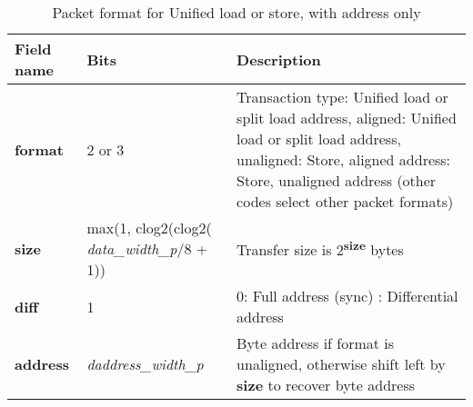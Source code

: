 \begin{table}[htp]
  \centering
  \caption{Packet format for Unified load or store, with address only}
  \label{tab:te_datadx0y1}
  \begin{tabulary}{\textwidth}{|l|p{38mm}|p{92mm}|}
    \hline
    {\bf Field name} & {\bf Bits} & {\bf Description} \\
    \hline
    \textbf{format} & 	2 or 3	& Transaction type: Unified load or split load address, aligned: Unified load or split load address, unaligned: Store, aligned address: Store, unaligned address\newline
		(other codes select other packet formats)\\
    \hline
    \textbf{size} & max(1, clog2(clog2( \textit{data\_width\_p}/8 + 1)) & Transfer size is 2\textsuperscript{\textbf{size}} bytes \\
    \hline
    \textbf{diff} & 1 & 0: Full address (sync)	:  Differential address\\
    \hline
    \textbf{address} &  \textit{daddress\_width\_p} & Byte address if format is unaligned, otherwise shift left by \textbf{size} to recover byte address \\
    \hline
  \end{tabulary}
\end{table}


